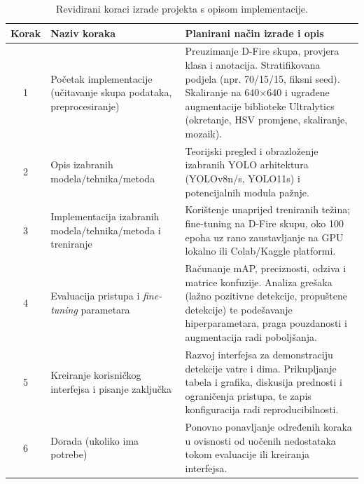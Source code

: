 \begin{table}[H]
\centering
\small
\begin{tabularx}{\linewidth}{@{}c>{\raggedright\arraybackslash}p{4cm}>{\raggedright\arraybackslash}X@{}}
\toprule
\textbf{Korak} & \textbf{Naziv koraka} & \textbf{Planirani način izrade i opis}\\
\midrule
1 & Početak implementacije (učitavanje skupa podataka, preprocesiranje) & Preuzimanje D-Fire skupa, provjera klasa i anotacija. Stratifikovana podjela (npr. 70/15/15, fiksni seed). Skaliranje na 640$\times$640 i ugrađene augmentacije biblioteke Ultralytics (okretanje, HSV promjene, skaliranje, mozaik). \\
2 & Opis izabranih modela/tehnika/metoda & Teorijski pregled i obrazloženje izabranih YOLO arhitektura (YOLOv8n/s, YOLO11s) i potencijalnih modula pažnje. \\
3 & Implementacija izabranih modela/tehnika/metoda i treniranje & Korištenje unaprijed treniranih težina; fine-tuning na D-Fire skupu, oko 100 epoha uz rano zaustavljanje na GPU lokalno ili Colab/Kaggle platformi. \\
4 & Evaluacija pristupa i \textit{fine-tuning} parametara & Računanje mAP, preciznosti, odziva i matrice konfuzije. Analiza grešaka (lažno pozitivne detekcije, propuštene detekcije) te podešavanje hiperparametara, praga pouzdanosti i augmentacija radi poboljšanja. \\
5 & Kreiranje korisničkog interfejsa i pisanje zaključka & Razvoj interfejsa za demonstraciju detekcije vatre i dima. Prikupljanje tabela i grafika, diskusija prednosti i ograničenja pristupa, te zapis konfiguracija radi reproducibilnosti. \\
6 & Dorada (ukoliko ima potrebe) & Ponovno ponavljanje određenih koraka u ovisnosti od uočenih nedostataka tokom evaluacije ili kreiranja interfejsa. \\
\bottomrule
\end{tabularx}
\caption{Revidirani koraci izrade projekta s opisom implementacije.}
\label{tab:koraci}
\end{table}


